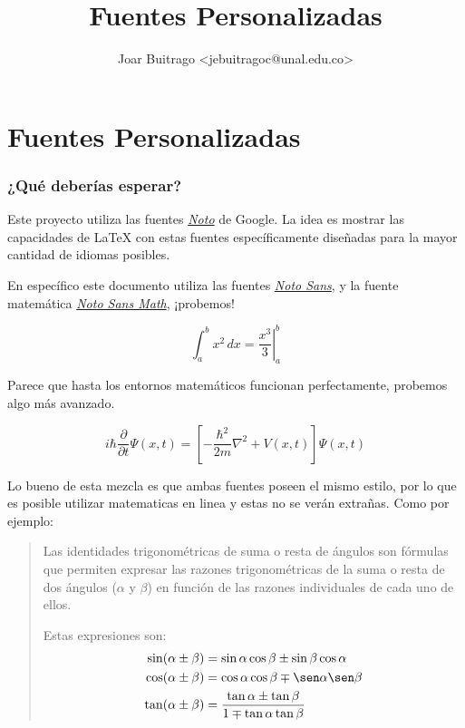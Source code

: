 \documentclass{article}
\title{Fuentes Personalizadas}
\author{Joar Buitrago <jebuitragoc@unal.edu.co>}
\date{}
\newcommand{\lmr}{\fontfamily{lmr}\selectfont}
\begin{document}
\part*{Fuentes Personalizadas}





\section{¿Qué deberías esperar?}

Este proyecto utiliza las fuentes \href{https://fonts.google.com/noto}{\emph{Noto}} de Google. La idea es mostrar las capacidades de {\lmr\LaTeX} con estas fuentes específicamente diseñadas para la mayor cantidad de idiomas posibles.

En específico este documento utiliza las fuentes \href{https://fonts.google.com/noto/specimen/Noto+Sans}{\emph{Noto Sans}}, y la fuente matemática \href{https://fonts.google.com/noto/specimen/Noto+Sans+Math}{\emph{Noto Sans Math}}, ¡probemos!

\begin{equation*}
    \int_a^b x^2 \, dx = \left.\frac{x^3}{3}\right|_a^b
\end{equation*}

Parece que hasta los entornos matemáticos funcionan perfectamente, probemos algo más avanzado.

\begin{equation*}
    i \hbar \frac{\partial}{\partial t} \Psi (x,t) = \left[ -\frac{\hbar^2}{2 m} \nabla^2 + V (x,t) \right] \Psi (x,t)
\end{equation*}

Lo bueno de esta mezcla es que ambas fuentes poseen el mismo estilo, por lo que es posible utilizar matematicas en linea y estas no se verán extrañas. Como por ejemplo:

\begin{quotation}
    \setlength{\parskip}{\baselineskip}
    Las identidades trigonométricas de suma o resta de ángulos son fórmulas que permiten expresar las razones trigonométricas de la suma o resta de dos ángulos (\(\alpha \) y \(\beta \)) en función de las razones individuales de cada uno de ellos.

    Estas expresiones son:
    \begin{align*}
        \sin (\alpha \pm \beta) &= \sin\alpha \cos\beta \pm \sin\beta \cos\alpha \\
        \cos(\alpha \pm \beta) &= \cos\alpha \cos\beta \mp \sen\alpha \sen\beta \\
        \tan(\alpha \pm \beta) &= \frac{\tan\alpha \pm \tan\beta}{1 \mp \tan\alpha \tan\beta}
    \end{align*}
\end{quotation}
\end{document}
